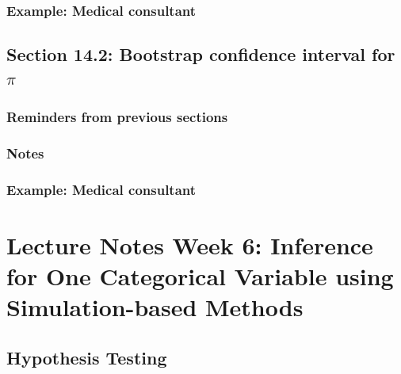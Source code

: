 \documentclass[
]{report}
\begin{document}
\hypertarget{example-medical-consultant-1}{%
\subsubsection*{Example: Medical consultant}\label{example-medical-consultant-1}}

\hypertarget{section-14.2-bootstrap-confidence-interval-for-pi}{%
\subsection*{\texorpdfstring{Section 14.2: Bootstrap confidence interval for \(\pi\)}{Section 14.2: Bootstrap confidence interval for \textbackslash pi}}\label{section-14.2-bootstrap-confidence-interval-for-pi}}

\hypertarget{reminders-from-previous-sections-3}{%
\subsubsection*{Reminders from previous sections}\label{reminders-from-previous-sections-3}}

\hypertarget{notes-16}{%
\subsubsection*{Notes}\label{notes-16}}

\hypertarget{example-medical-consultant-2}{%
\subsubsection*{Example: Medical consultant}\label{example-medical-consultant-2}}

\hypertarget{lecture-notes-week-6-inference-for-one-categorical-variable-using-simulation-based-methods}{%
\section{Lecture Notes Week 6: Inference for One Categorical Variable using Simulation-based Methods}\label{lecture-notes-week-6-inference-for-one-categorical-variable-using-simulation-based-methods}}

\hypertarget{hypothesis-testing}{%
\subsection*{Hypothesis Testing}\label{hypothesis-testing}}
\end{document}

